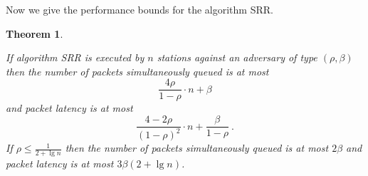 \documentclass[11pt]{article}
\newtheorem{theorem}{Theorem}
\begin{document}
Now we give the performance bounds for the algorithm \textsc{SRR}.



\begin{theorem}
\label{thm:SRR}

If algorithm \textsc{SRR}  is executed by $n$ stations against an adversary of type $(\rho,\beta)$ then the number of packets simultaneously queued  is at most
\begin{equation}
\label{eqn:SRR-queues}
\frac{4\rho }{1-\rho}\cdot n +\beta
\end{equation}
and packet latency is at most
\begin{equation}
\label{eqn:SRR-latency}
\frac{4-2\rho}{(1-\rho)^2}\cdot n +\frac{\beta}{1-\rho} 
\ .
\end{equation}
If $\rho\le\frac{1}{2+\lg n}$ then the number of packets simultaneously queued is at most $2\beta$ and packet latency is at most $3\beta(2+\lg n)$.
\end{theorem}
\end{document}
